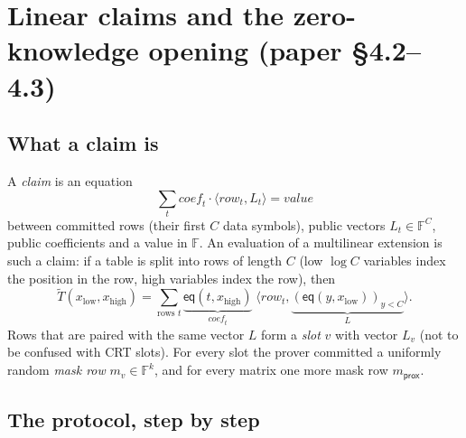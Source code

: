 \documentclass[11pt,a4paper]{article}
\newcommand{\F}{\mathbb{F}}
\newcommand{\eq}{\mathsf{eq}}
\newcommand{\ip}[2]{\langle #1, #2\rangle}
\newcommand{\mle}[1]{\widetilde{#1}}
\theoremstyle{definition}
\theoremstyle{plain}
\begin{document}
\section{Linear claims and the zero-knowledge opening (paper \S4.2--4.3)}
\label{sec:opening}

\subsection{What a claim is}

A \emph{claim} is an equation
\[
  \sum_t \mathit{coef}_t\cdot\ip{\mathit{row}_t}{L_t}=\mathit{value}
\]
between committed rows (their first $C$ data symbols), public vectors $L_t\in\F^C$, public coefficients
and a value in $\F$. An evaluation of a multilinear extension is such a claim: if a table is split into
rows of length $C$ (low $\log C$ variables index the position in the row, high variables index the
row), then
\[
  \mle T(x_{\mathrm{low}},x_{\mathrm{high}})=\sum_{\text{rows } t}\underbrace{\eq(t,x_{\mathrm{high}})}_{\mathit{coef}_t}
  \;\ip{\mathit{row}_t}{\underbrace{(\eq(y,x_{\mathrm{low}}))_{y<C}}_{L}} .
\]
Rows that are paired with the same vector $L$ form a \emph{slot} $v$ with vector $L_v$ (not to be confused
with CRT slots). For every slot the prover committed a uniformly random \emph{mask row} $m_v\in\F^k$,
and for every matrix one more mask row $m_{\mathsf{prox}}$.

\subsection{The protocol, step by step}
\end{document}
